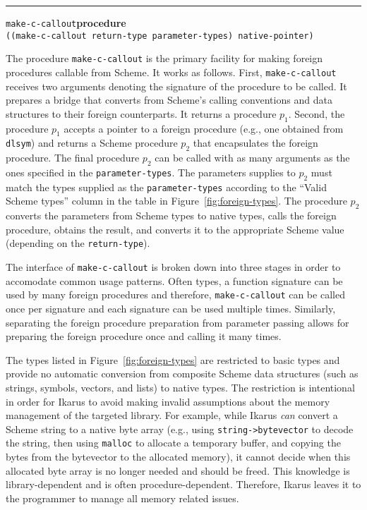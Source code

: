 \documentclass[onecolumn, 12pt, twoside, openright, dvipdfm]{book}
\makeatletter
\newcommand{\idxlabeldefun}[5]{
\vspace{1ex}
\rule{\textwidth}{2pt}
{\phantomsection\index{#1@\texttt{#2}}\label{#3}{\Large\texttt{#4}}\hfill\textbf{#5}}\\}
\newcommand{\idxdefun}[3]{\idxlabeldefun{#1}{#2}{#1}{#2}{#3}}
\newcommand{\defun}[2]{\idxdefun{#1}{#1}{#2}}
\makeatother
\begin{document}
\defun{make-c-callout}{procedure}
\texttt{((make-c-callout return-type parameter-types) native-pointer)}

The procedure \texttt{make-c-callout} is the primary facility for
making foreign procedures callable from Scheme.  It works as
follows.  First, \texttt{make-c-callout} receives two arguments
denoting the signature of the procedure to be called.  It prepares a
bridge that converts from Scheme's calling conventions and data
structures to their foreign counterparts.  It returns a procedure
$p_1$.  Second, the procedure $p_1$ accepts a pointer to a foreign
procedure (e.g., one obtained from \texttt{dlsym}) and returns a
Scheme procedure $p_2$ that encapsulates the foreign procedure.  The
final procedure $p_2$ can be called with as many arguments as the
ones specified in the \texttt{parameter-types}.  The parameters
supplies to $p_2$ must match the types supplied as the
\texttt{parameter-types} according to the ``Valid Scheme types''
column in the table in Figure~\ref{fig:foreign-types}.  The
procedure $p_2$ converts the parameters from Scheme types to native
types, calls the foreign procedure, obtains the result, and converts
it to the appropriate Scheme value (depending on the
\texttt{return-type}).

The interface of \texttt{make-c-callout} is broken down into three
stages in order to accomodate common usage patterns.  Often types, a
function signature can be used by many foreign procedures and
therefore, \texttt{make-c-callout} can be called once per signature
and each signature can be used multiple times.  Similarly,
separating the foreign procedure preparation from parameter passing
allows for preparing the foreign procedure once and calling it many
times. 

The types listed in Figure~\ref{fig:foreign-types} are restricted to
basic types and provide no automatic conversion from composite
Scheme data structures (such as strings, symbols, vectors, and
lists) to native types.  The restriction is intentional in order for
Ikarus to avoid making invalid assumptions about the memory
management of the targeted library.  For example, while Ikarus
\emph{can} convert a Scheme string to a native byte array (e.g.,
using \texttt{string->bytevector} to decode the string, then using
\texttt{malloc} to allocate a temporary buffer, and copying the
bytes from the bytevector to the allocated memory), it cannot decide
when this allocated byte array is no longer needed and should be
freed.  This knowledge is library-dependent and is often
procedure-dependent.  Therefore, Ikarus leaves it to the programmer
to manage all memory related issues.
\end{document}
